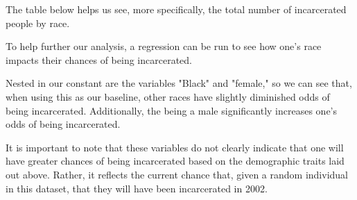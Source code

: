 \documentclass{article}
\begin{document}
The table below helps us see, more specifically, the total number of incarcerated people by race.



To help further our analysis, a regression can be run to see how one's race impacts their chances of being incarcerated.



Nested in our constant are the variables "Black" and "female," so we can see that, when using this as our baseline, other races have slightly diminished odds of being incarcerated.  Additionally, the being a male significantly increases one's odds of being incarcerated.

It is important to note that these variables do not clearly indicate that one will have greater chances of being incarcerated based on the demographic traits laid out above.  Rather, it reflects the current chance that, given a random individual in this dataset, that they will have been incarcerated in 2002.
\end{document}
